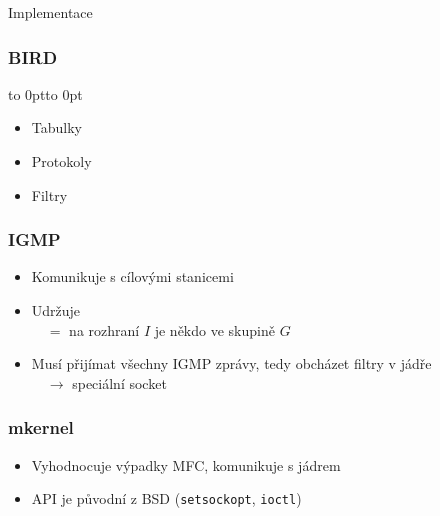 \documentclass{beamer}
\begin{document}
\begin{frame}[plain,c]
  \begin{center}
    \Huge Implementace
  \end{center}
\end{frame}

\begin{frame}[fragile]\frametitle{BIRD}
  \vbox to 0pt{\vss}\nointerlineskip\vbox to 0pt{\vss
  \begin{itemize}
    \item Tabulky
    \item Protokoly
    \item<3> Filtry
  \end{itemize}\vss}
\end{frame}


\begin{frame}\frametitle{IGMP}
  \begin{itemize}
    \item Komunikuje s cílovými stanicemi
    \item Udržuje  \\
      $\quad=$ na rozhraní $I$ je někdo ve skupině $G$
    \item Musí přijímat všechny IGMP zprávy, tedy obcházet filtry v jádře \\
      $\quad\rightarrow$ speciální socket
  \end{itemize}
\end{frame}

\begin{frame}\frametitle{mkernel}
  \begin{itemize}
    \item Vyhodnocuje výpadky MFC, komunikuje s jádrem
    \item API je původní z BSD (\texttt{setsockopt}, \texttt{ioctl})
  \end{itemize}
\end{frame}
\end{document}
